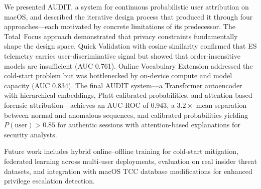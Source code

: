 \documentclass[letterpaper,twocolumn,10pt]{article}
\begin{document}
We presented AUDIT, a system for continuous probabilistic user
attribution on macOS, and described the iterative design process
that produced it through four approaches---each motivated by
concrete limitations of its predecessor.  The Total~Focus approach
demonstrated that privacy constraints fundamentally shape the
design space.  Quick Validation with cosine similarity confirmed
that ES telemetry carries user-discriminative signal but showed
that order-insensitive models are insufficient (AUC 0.761).  Online
Vocabulary Extension addressed the cold-start problem but was
bottlenecked by on-device compute and model capacity (AUC 0.834).
The final AUDIT system---a Transformer autoencoder with
hierarchical embeddings, Platt-calibrated probabilities, and
attention-based forensic attribution---achieves an AUC-ROC of
0.943, a $3.2\times$ mean separation between normal and anomalous
sequences, and calibrated probabilities yielding
$P(\text{user}){>}0.85$ for authentic sessions with
attention-based explanations for security analysts.

Future work includes hybrid online--offline training for cold-start
mitigation, federated learning across multi-user deployments,
evaluation on real insider threat datasets, and integration with
macOS TCC database modifications for enhanced privilege escalation
detection.


\balance


\end{document}
